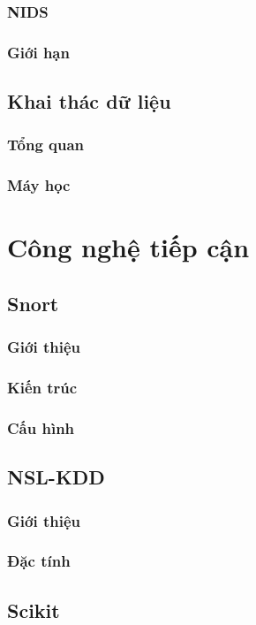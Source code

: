 \documentclass{article}
\begin{document}
\begin{flushleft}
        \subsubsection{NIDS}
        \subsubsection{Giới hạn}
        \subsection{Khai thác dữ liệu}
        \subsubsection{Tổng quan}
        \subsubsection{Máy học}
        \newpage
        \section{Công nghệ tiếp cận}
        \subsection{Snort}
        \subsubsection{Giới thiệu}
        \subsubsection{Kiến trúc}
        \subsubsection{Cấu hình}
        \subsection{NSL-KDD}
        \subsubsection{Giới thiệu}
        \subsubsection{Đặc tính}
        \subsection{Scikit}

\end{flushleft}
\end{document}
